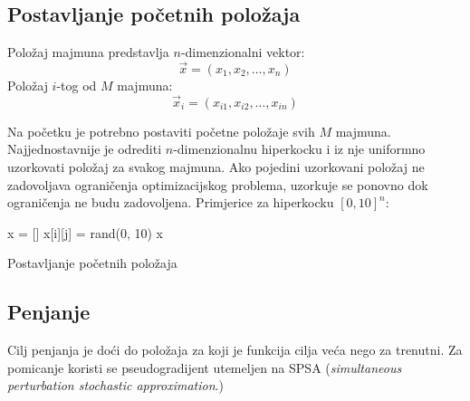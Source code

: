 \subsection{Postavljanje početnih položaja}
Položaj majmuna predstavlja $n$-dimenzionalni vektor:
\begin{equation}
	\vec{x} = (x_1, x_2, \dots, x_n)
\end{equation}
Položaj $i$-tog od $M$ majmuna:
\begin{equation}
	\vec{x}_i = (x_{i1}, x_{i2}, \dots, x_{in})
\end{equation}

Na početku je potrebno postaviti početne položaje svih $M$ majmuna. Najjednostavnije je odrediti $n$-dimenzionalnu hiperkocku i iz nje uniformno uzorkovati položaj za svakog majmuna. Ako pojedini uzorkovani položaj ne zadovoljava ograničenja optimizacijskog problema, uzorkuje se ponovno dok ograničenja ne budu zadovoljena. Primjerice za hiperkocku $[0, 10]^{n}$:
\begin{algorithm}[H]
	\begin{algorithmic}[1]
		\State x = []
		\Repeat
		\State x[i][j] = rand(0, 10)
		\EndFor
		\EndFor
		\State
		\Return x
		\EndFunction
	\end{algorithmic}
	\caption{Postavljanje početnih položaja}
\end{algorithm} 

\subsection{Penjanje}
Cilj penjanja je doći do položaja za koji je funkcija cilja veća nego za trenutni. Za pomicanje koristi se pseudogradijent utemeljen na SPSA (\textit{simultaneous perturbation stochastic approximation}.)

